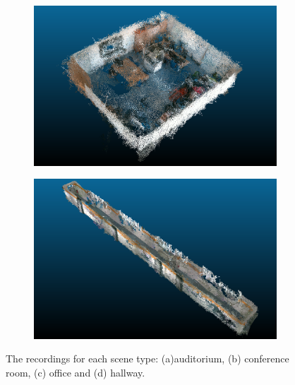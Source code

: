\documentclass[main.tex]{subfiles}
\begin{document}
\begin{figure}[H]
\begin{subfigure}{0.5\textwidth}
        \centering
        \includegraphics[width=0.9\linewidth]{images/425.png}
        \caption[Dynamic Dataset office]{}
        \label{fig:fin425}
    \end{subfigure}
    \begin{subfigure}{0.5\textwidth}
        \centering
        \includegraphics[width=0.9\linewidth]{images/hallway.png}
        \caption[Dynamic Dataset office]{}
        \label{fig:finhw}
    \end{subfigure}
    \caption[Dynamic Datasets]{The recordings for each scene type: (a)auditorium, (b) conference room, (c) office and (d) hallway.}
    \label{fig:fin}
\end{figure}
\end{document}

